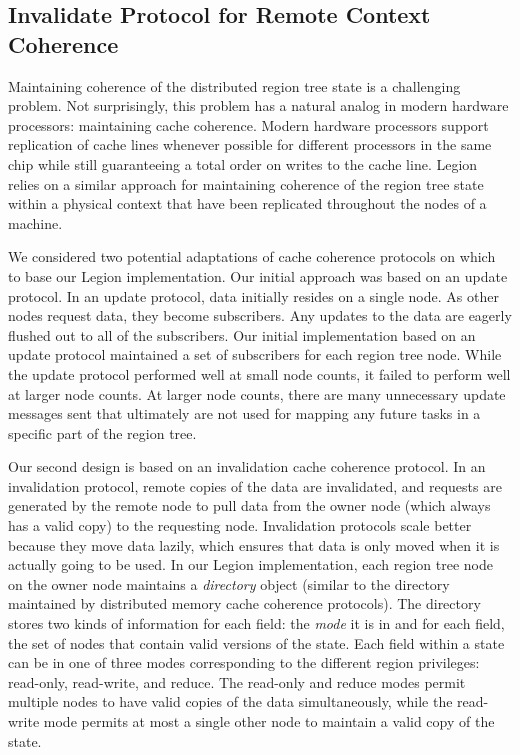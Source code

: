 \subsection{Invalidate Protocol for Remote Context Coherence}
\label{subsec:invalidate}

Maintaining coherence of the distributed region tree 
state is a challenging problem. Not surprisingly, this
problem has a natural analog in modern hardware processors:
maintaining cache coherence. Modern hardware processors
support replication of cache lines whenever possible for different
processors in the same chip while still guaranteeing a 
total order on writes to the cache line. Legion relies on
a similar approach for maintaining coherence of the region
tree state within a physical context that have been replicated
throughout the nodes of a machine.

We considered two potential adaptations of cache coherence
protocols on which to base our Legion implementation.  Our
initial approach was based on an update protocol.  In an
update protocol, data initially resides on a single node.
As other nodes request data, they become subscribers. Any
updates to the data are eagerly flushed out to all of the
subscribers.  Our initial implementation based on an 
update protocol maintained a set of subscribers for each
region tree node.  While the update protocol performed well
at small node counts, it failed to perform well at larger
node counts.  At larger node counts, there are many
unnecessary update messages sent that ultimately are  
not used for mapping any future tasks in a specific
part of the region tree.

Our second design is based on an invalidation cache 
coherence protocol. In an invalidation protocol, remote
copies of the data are invalidated, and requests are
generated by the remote node to pull data from the owner
node (which always has a valid copy) to the requesting
node. Invalidation protocols scale better because they
move data lazily, which ensures that data is only moved
when it is actually going to be used. In our Legion 
implementation, each region tree node on the owner node
maintains a {\em directory} object (similar to the directory
maintained by distributed memory cache coherence protocols).
The directory stores two kinds of information for each field:
the {\em mode} it is in and for each field, the set of
nodes that contain valid versions of the state. Each 
field within a state can be in one of three modes 
corresponding to the different region privileges:
read-only, read-write, and reduce.  The read-only and
reduce modes permit multiple nodes to have valid copies
of the data simultaneously, while the read-write mode
permits at most a single other node to maintain a valid 
copy of the state.

